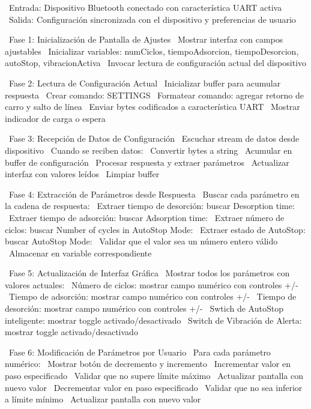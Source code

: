 \begin{algorithmic}[1]
\State~Entrada: Dispositivo Bluetooth conectado con característica UART activa
\State~Salida: Configuración sincronizada con el dispositivo y preferencias de usuario

\State~Fase 1: Inicialización de Pantalla de Ajustes
\State~Mostrar interfaz con campos ajustables
\State~Inicializar variables: numCiclos, tiempoAdsorcion, tiempoDesorcion, autoStop, vibracionActiva
\State~Invocar lectura de configuración actual del dispositivo

\State~Fase 2: Lectura de Configuración Actual
\State~Inicializar buffer para acumular respuesta
\State~Crear comando: SETTINGS
\State~Formatear comando: agregar retorno de carro y salto de línea
\State~Enviar bytes codificados a característica UART
\State~Mostrar indicador de carga o espera

\State~Fase 3: Recepción de Datos de Configuración
\State~Escuchar stream de datos desde dispositivo
\State~Cuando se reciben datos:
\State~Convertir bytes a string
\State~Acumular en buffer de configuración
%
    \State~Procesar respuesta y extraer parámetros
    \State~Actualizar interfaz con valores leídos
    \State~Limpiar buffer
\EndIf%

\State~Fase 4: Extracción de Parámetros desde Respuesta
\State~Buscar cada parámetro en la cadena de respuesta:
\State~Extraer tiempo de desorción: buscar Desorption time:
\State~Extraer tiempo de adsorción: buscar Adsorption time:
\State~Extraer número de ciclos: buscar Number of cycles in AutoStop Mode:
\State~Extraer estado de AutoStop: buscar AutoStop Mode:
%
    \State~Validar que el valor sea un número entero válido
    \State~Almacenar en variable correspondiente
\EndFor%

\State~Fase 5: Actualización de Interfaz Gráfica
\State~Mostrar todos los parámetros con valores actuales:
\State~Número de ciclos: mostrar campo numérico con controles +/-
\State~Tiempo de adsorción: mostrar campo numérico con controles +/-
\State~Tiempo de desorción: mostrar campo numérico con controles +/-
\State~Swtich de AutoStop inteligente: mostrar toggle activado/desactivado
\State~Switch de Vibración de Alerta: mostrar toggle activado/desactivado

\State~Fase 6: Modificación de Parámetros por Usuario
\State~Para cada parámetro numérico:
\State~Mostrar botón de decremento y incremento
%
    \State~Incrementar valor en paso especificado
    \State~Validar que no supere límite máximo
    \State~Actualizar pantalla con nuevo valor
\EndIf%
%
    \State~Decrementar valor en paso especificado
    \State~Validar que no sea inferior a límite mínimo
    \State~Actualizar pantalla con nuevo valor
\EndIf%


\end{algorithmic}
